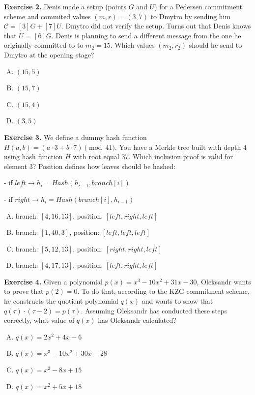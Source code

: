 \documentclass[../lecture-notes.tex]{subfiles}
\begin{document}
\textbf{Exercise 2.} Denis made a setup (points $G$ and $U$) for a Pedersen commitment scheme and commited values $(m, r) = (3, 7)$ to Dmytro
by sending him $\mathcal{C} = [3]G + [7]U$. Dmytro did not verify the setup. Turns out that Denis knows that $U$ = $[6]G$. 
Denis is planning to send a different message from the one he originally committed to
to $m_2 = 15$. Which values $(m_2, r_2)$ should he send to Dmytro at the opening stage?
\begin{enumerate}[(A)]
    \item $(15, 5)$
    \item $(15, 7)$
    \item $(15, 4)$
    \item $(3, 5)$
\end{enumerate}

\textbf{Exercise 3.} We define a dummy hash function $H(a, b) = (a \cdot 3 + b \cdot 7) \pmod{41}$. You have a Merkle tree built with depth $4$ 
using hash function $H$ with root equal $37$. Which inclusion proof is valid for element $3$?
Position defines how leaves should be hashed:

    - if $left \rightarrow h_i = Hash(h_{i-1}, branch[i])$

    - if $right \rightarrow  h_i = Hash(branch[i], h_{i-1})$

\begin{enumerate}[(A)]
    \item branch: $[4, 16, 13]$, position: $[left, right, left]$
    \item branch: $[1, 40, 3]$, position: $[left, left, left]$
    \item branch: $[5, 12, 13]$, position: $[right, right, left]$
    \item branch: $[4, 17, 13]$, position: $[left, right, left]$
\end{enumerate}

\textbf{Exercise 4.} Given a polynomial $p(x) = x^3 - 10x^2 + 31x - 30$, Oleksandr wants to prove that $p(2)=0$. 
To do that, according to the KZG commitment scheme, he constructs the quotient polynomial $q(x)$ and wants 
to show that $q(\tau) \cdot (\tau - 2) = p(\tau)$. Assuming Oleksandr has conducted these steps correctly, 
what value of $q(x)$ has Oleksandr calculated?

\begin{enumerate}[(A)]
    \item $q(x) = 2x^2 + 4x - 6$
    \item $q(x) = x^3 - 10x^2 + 30x - 28$
    \item $q(x) = x^2 - 8x + 15$
    \item $q(x) = x^2 + 5x + 18$
\end{enumerate}
\end{document}
